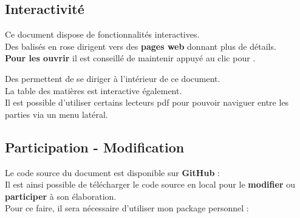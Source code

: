 \subsection*{Interactivité}

Ce document dispose de fonctionnalités interactives. \\
Des  balisés en {\color{monrose}rose} dirigent vers des \textbf{pages web} donnant plus de détails. \\
\textbf{Pour les ouvrir} il est conseillé de maintenir  appuyé au clic pour . 

Des  permettent de se diriger à l'intérieur de ce document. \\

La table des matières est interactive également. \\

Il est possible d'utiliser certains lecteurs pdf pour pouvoir naviguer entre les parties via un menu latéral. 

\subsection*{Participation - Modification}

Le code source du document est disponible sur \textbf{GitHub} : \\
Il est ainsi possible de télécharger le code source en local pour le \textbf{modifier} ou \textbf{participer} à son élaboration. \\
Pour ce faire, il sera nécessaire d'utiliser mon package personnel : 
